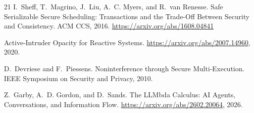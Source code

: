 \documentclass[10pt]{article}
\begin{document}
\begin{thebibliography}{21}
I.~Sheff, T.~Magrino, J.~Liu, A.~C. Myers, and R.~van Renesse.
\newblock Safe Serializable Secure Scheduling: Transactions and the Trade-Off Between Security and Consistency.
\newblock ACM CCS, 2016. \url{https://arxiv.org/abs/1608.04841}

\newblock Active-Intruder Opacity for Reactive Systems.
\newblock \url{https://arxiv.org/abs/2007.14960}, 2020.

D.~Devriese and F.~Piessens.
\newblock Noninterference through Secure Multi-Execution.
\newblock IEEE Symposium on Security and Privacy, 2010.

Z.~Garby, A.~D. Gordon, and D.~Sands.
\newblock The LLMbda Calculus: AI Agents, Conversations, and Information Flow.
\newblock \url{https://arxiv.org/abs/2602.20064}, 2026.

\end{thebibliography}
\end{document}
